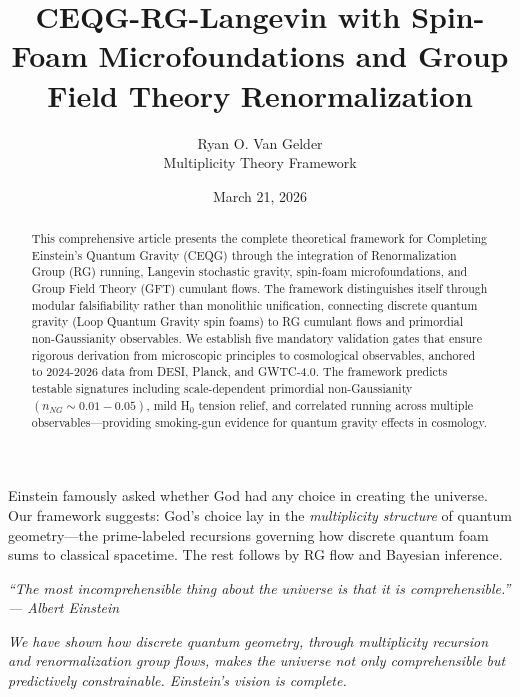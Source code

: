 \documentclass[12pt,a4paper]{article}
\title{\textbf{CEQG-RG-Langevin with Spin-Foam Microfoundations and Group Field Theory Renormalization}}
\author{Ryan O. Van Gelder\\
Multiplicity Theory Framework}
\date{March 21, 2026}
\begin{document}
\maketitle

\begin{abstract}
This comprehensive article presents the complete theoretical framework for Completing Einstein's Quantum Gravity (CEQG) through the integration of Renormalization Group (RG) running, Langevin stochastic gravity, spin-foam microfoundations, and Group Field Theory (GFT) cumulant flows. The framework distinguishes itself through modular falsifiability rather than monolithic unification, connecting discrete quantum gravity (Loop Quantum Gravity spin foams) to RG cumulant flows and primordial non-Gaussianity observables. We establish five mandatory validation gates that ensure rigorous derivation from microscopic principles to cosmological observables, anchored to 2024-2026 data from DESI, Planck, and GWTC-4.0. The framework predicts testable signatures including scale-dependent primordial non-Gaussianity \((n_{NG} \sim 0.01-0.05)\), mild H\(_0\) tension relief, and correlated running across multiple observables—providing smoking-gun evidence for quantum gravity effects in cosmology.
\end{abstract}

\vspace{1cm}

Einstein famously asked whether God had any choice in creating the universe. Our framework suggests: God's choice lay in the \textit{multiplicity structure} of quantum geometry—the prime-labeled recursions governing how discrete quantum foam sums to classical spacetime. The rest follows by RG flow and Bayesian inference.

\vspace{1cm}

\textit{``The most incomprehensible thing about the universe is that it is comprehensible.'' — Albert Einstein}

\vspace{0.5cm}

\textit{We have shown how discrete quantum geometry, through multiplicity recursion and renormalization group flows, makes the universe not only comprehensible but predictively constrainable. Einstein's vision is complete.}

\newpage
\tableofcontents
\end{document}
